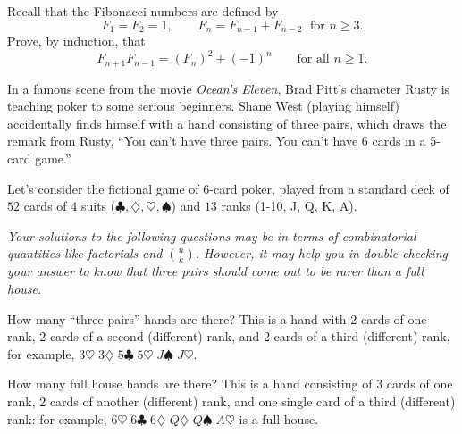 \documentclass[12pt]{article}
\begin{document}
\newpage


\begin{problem}{10}
Recall that the Fibonacci numbers are defined by
\[ F_1 = F_2 = 1, \qquad    F_n = F_{n-1} + F_{n-2} \; \text{ for } n \geq 3. \]
Prove, by induction, that
\[ F_{n+1}F_{n-1} = (F_n)^2 + (-1)^n \qquad \text{for all } n \geq 1. \]
\end{problem}

\newpage


\begin{problem}{12}

In a famous scene from the movie \emph{Ocean's Eleven}, Brad Pitt's character Rusty is teaching poker to some serious beginners. 
Shane West (playing himself) accidentally finds himself with a hand consisting of three pairs, which draws the remark from Rusty, ``You can't have three pairs. You can't have 6 cards in a 5-card game.''

Let's consider the fictional game of $6$-card poker, played from a standard deck of $52$ cards of 4 suits ($\clubsuit, \diamondsuit, \heartsuit, \spadesuit$) and $13$ ranks (1-10, J, Q, K, A).

\emph{Your solutions to the following questions may be in terms of combinatorial quantities like factorials and ${n \choose k}$. However, it may help you in double-checking your answer to know that three pairs should come out to be rarer than a full house.}

\bparts
{} How many ``three-pairs'' hands are there? This is a hand with 2 cards of one rank, 2 cards of a second (different) rank, and 2 cards of a third (different) rank, for example, $3\heartsuit\; 3\diamondsuit\;5\clubsuit\; 5\heartsuit\;  J\spadesuit\; J\heartsuit$.

\newpage

 How many full house hands are there? This is a hand consisting of 3 cards of one rank, 2 cards of another (different) rank, and one single card of a third (different) rank: for example, $6\heartsuit\; 6\clubsuit\; 6\diamondsuit\; Q\diamondsuit\; Q\spadesuit\; A\heartsuit$ is a full house.


\vspace{6cm}


\eparts
\end{problem}
\end{document}
